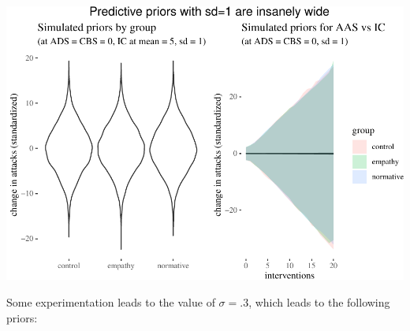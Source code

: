 \documentclass[10pt,dvipsnames,enabledeprecatedfontcommands]{scrartcl}
\begin{document}
\begin{center}\includegraphics[width=1\linewidth]{bayesianReport_files/figure-latex/unnamed-chunk-6-1} \end{center}
\normalsize

Some experimentation leads to the value of \(\sigma =.3\), which leads
to the following priors:

\vspace{1mm}
\footnotesize
\end{document}
